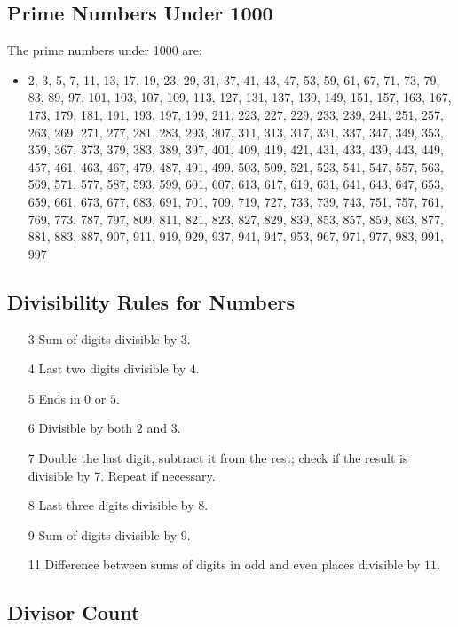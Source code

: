 \documentclass[10pt, a4paper,twocolumn]{article}
\begin{document}
\subsection{Prime Numbers Under 1000}

The prime numbers under 1000 are:

\begin{itemize}
    \item 2, 3, 5, 7, 11, 13, 17, 19, 23, 29, 31, 37, 41, 43, 47, 53, 59, 61, 67, 71, 73, 79, 83, 89, 97, 
    101, 103, 107, 109, 113, 127, 131, 137, 139, 149, 151, 157, 163, 167, 173, 179, 181, 191, 193, 197, 199, 
    211, 223, 227, 229, 233, 239, 241, 251, 257, 263, 269, 271, 277, 281, 283, 293, 307, 311, 313, 317, 331, 
    337, 347, 349, 353, 359, 367, 373, 379, 383, 389, 397, 401, 409, 419, 421, 431, 433, 439, 443, 449, 457, 
    461, 463, 467, 479, 487, 491, 499, 503, 509, 521, 523, 541, 547, 557, 563, 569, 571, 577, 587, 593, 599, 601, 607, 613, 617, 619, 631, 641, 643, 647, 653, 659, 
    661, 673, 677, 683, 691, 701, 709, 719, 727, 733, 739, 743, 751, 757, 761, 769, 773, 787, 797, 809, 811, 821,
    823, 827, 829, 839, 853, 857, 859, 863, 877, 881, 883, 887, 907, 911, 919, 929, 937, 941, 947, 953, 967, 
    971, 977, 983, 991, 997
\end{itemize}

\subsection{Divisibility Rules for Numbers}
\begin{itemize}
    \item[3] Sum of digits divisible by $3$.
    \item[4] Last two digits divisible by $4$.
    \item[5] Ends in $0$ or $5$.
    \item[6] Divisible by both $2$ and $3$.
    \item[7] Double the last digit, subtract it from the rest; check if the result is divisible by $7$. Repeat if necessary.
    \item[8] Last three digits divisible by $8$.
    \item[9] Sum of digits divisible by $9$.
    \item[11] Difference between sums of digits in odd and even places divisible by $11$.
\end{itemize}


\subsection{Divisor Count}

\end{document}
